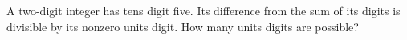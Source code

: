 A two-digit integer has tens digit five. Its difference from the sum of its digits is divisible by its nonzero units digit. How many units digits are possible?
